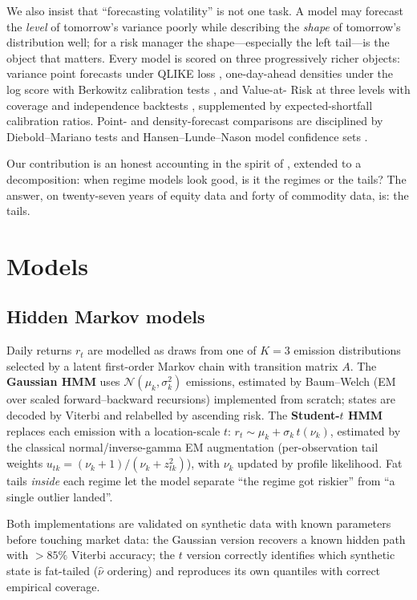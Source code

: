 \documentclass[11pt]{article}
\begin{document}
We also insist that ``forecasting volatility'' is not one task. A model may
forecast the \emph{level} of tomorrow's variance poorly while describing
the \emph{shape} of tomorrow's distribution well; for a risk manager the
shape---especially the left tail---is the object that matters. Every model
is scored on three progressively richer objects: variance point forecasts
under QLIKE loss \citep{patton2011}, one-day-ahead densities under the log
score with Berkowitz calibration tests \citep{berkowitz2001}, and Value-at-
Risk at three levels with coverage and independence backtests
\citep{kupiec1995, christoffersen1998}, supplemented by expected-shortfall
calibration ratios. Point- and density-forecast comparisons are
disciplined by Diebold--Mariano tests \citep{diebold1995} and
Hansen--Lunde--Nason model confidence sets \citep{hansen2011}.

Our contribution is an honest accounting in the spirit of
\citet{hansen2005}, extended to a decomposition: when regime models look
good, is it the regimes or the tails? The answer, on twenty-seven years of
equity data and forty of commodity data, is: the tails.

\section{Models}
\subsection{Hidden Markov models}
Daily returns $r_t$ are modelled as draws from one of $K=3$ emission
distributions selected by a latent first-order Markov chain with transition
matrix $A$. The \textbf{Gaussian HMM} uses
$\mathcal{N}(\mu_k,\sigma_k^2)$ emissions, estimated by Baum--Welch
(EM over scaled forward--backward recursions) implemented from scratch;
states are decoded by Viterbi and relabelled by ascending risk.
The \textbf{Student-$t$ HMM} replaces each emission with a location-scale
$t$: $r_t \sim \mu_k + \sigma_k\, t(\nu_k)$, estimated by the classical
normal/inverse-gamma EM augmentation (per-observation tail weights
$u_{tk}=(\nu_k+1)/(\nu_k+z_{tk}^2)$), with $\nu_k$ updated by profile
likelihood. Fat tails \emph{inside} each regime let the model separate
``the regime got riskier'' from ``a single outlier landed''.

Both implementations are validated on synthetic data with known parameters
before touching market data: the Gaussian version recovers a known hidden
path with $>85\%$ Viterbi accuracy; the $t$ version correctly identifies
which synthetic state is fat-tailed ($\hat\nu$ ordering) and reproduces its
own quantiles with correct empirical coverage.
\end{document}

